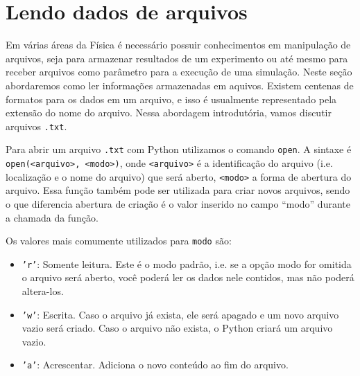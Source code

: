\section{Lendo dados de arquivos}


Em várias áreas da Física é necessário possuir conhecimentos em manipulação de arquivos, seja para armazenar resultados de um experimento ou até mesmo para receber arquivos como parâmetro para a execução de uma simulação. Neste seção abordaremos como ler informações armazenadas em aquivos. Existem centenas de formatos para os dados em um arquivo, e isso é usualmente representado pela extensão do nome do arquivo. Nessa abordagem introdutória, vamos discutir arquivos {\tt .txt}.


Para abrir um arquivo  {\tt .txt} com Python utilizamos o comando {\tt open}. A sintaxe é {\tt open(<arquivo>, <modo>)}, onde {\tt <arquivo>} é a identificação do arquivo (i.e. localização e o nome do arquivo) que será aberto, {\tt <modo>} a forma de abertura do arquivo. Essa função também pode ser utilizada para criar novos arquivos, sendo o que diferencia abertura de criação é o valor inserido no campo “modo” durante a chamada da função.

Os valores mais comumente utilizados para {\tt modo} são:
\begin{itemize}
    \item {\tt 'r'}: Somente leitura. Este é o modo padrão, i.e. se a opção modo for omitida o arquivo será aberto, você poderá ler os dados nele contidos, mas não poderá altera-los.
    \item {\tt 'w'}: Escrita. Caso o arquivo já exista, ele será apagado e um novo arquivo vazio será criado. Caso o arquivo não exista, o Python criará um arquivo vazio.
    \item {\tt 'a'}: Acrescentar. Adiciona o novo conteúdo ao fim do arquivo.
\end{itemize}

